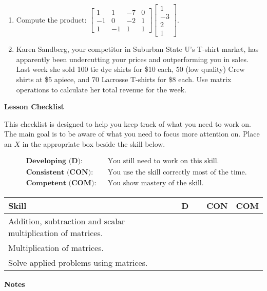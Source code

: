 \documentclass[10pt]{book}
\theoremstyle{definition}
\theoremstyle{remark}
\begin{document}
\begin{large}
\begin{enumerate}
\item Compute the product: $\begin{bmatrix} 1 & 1 & -7 & 0 \\ -1 & 0& -2 & 1 \\1 & -1 & 1 & 1  \end{bmatrix} \begin{bmatrix}1 \\-3\\2\\1 \end{bmatrix}.$\vfil
\item Karen Sandberg, your competitor in Suburban State U’s T-shirt market, has apparently been undercutting your prices and outperforming you in sales. Last week she sold 100 tie dye shirts for \$10 each, 50 (low quality) Crew shirts at \$5 apiece, and 70 Lacrosse T-shirts for \$8 each. Use matrix operations to calculate her total revenue for the week.\vfil
\end{enumerate}

\noindent
\textbf{Lesson Checklist}
\bigskip

\noindent
This checklist is designed to help you keep track of what you need to work on. The main goal is to be aware of what you need to focus more attention on. Place an $X$ in the appropriate box beside the skill below. 
\bigskip

\noindent
\begin{align*}
&\textbf{Developing (D):} &&\textrm{You still need to work on this skill.}\\
&\textbf{Consistent (CON):} &&\textrm{You use the skill correctly most of the time.}\\
&\textbf{Competent (COM):} &&\textrm{You show mastery of the skill.} 
\end{align*}
\vfil

\begin{center}
\begin{tabular}{|l|l|l|l|}
\hline
\textbf{Skill} & \textbf{~~D~~} & \textbf{CON} & \textbf{COM} \\
\hline
Addition, subtraction and scalar multiplication of matrices.&&&\\
\hline
Multiplication of matrices.&&&\\
\hline
Solve applied problems using matrices.&&&\\
\hline
\end{tabular}
\end{center}
 \vfil

\noindent
\textbf{Notes}
\end{large} \vfil
\newpage
\end{document}
